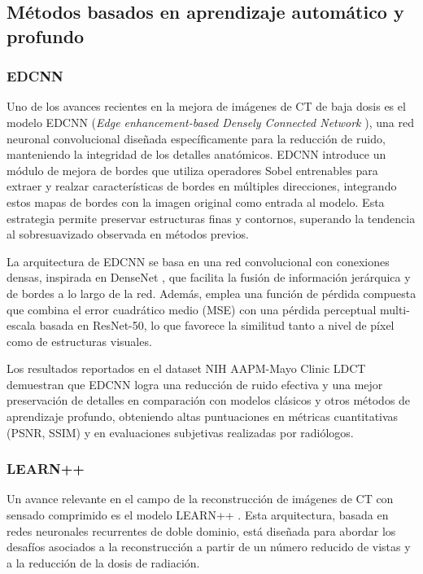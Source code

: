 \subsection{Métodos basados en aprendizaje automático y profundo}

\subsubsection{EDCNN}

Uno de los avances recientes en la mejora de imágenes de CT de baja dosis es el modelo EDCNN (\textit{Edge enhancement-based Densely Connected Network} \cite{EDCNN}), una red neuronal convolucional diseñada específicamente para la reducción de ruido, manteniendo la integridad de los detalles anatómicos. EDCNN introduce un módulo de mejora de bordes que utiliza operadores Sobel entrenables para extraer y realzar características de bordes en múltiples direcciones, integrando estos mapas de bordes con la imagen original como entrada al modelo. Esta estrategia permite preservar estructuras finas y contornos, superando la tendencia al sobresuavizado observada en métodos previos.

La arquitectura de EDCNN se basa en una red convolucional con conexiones densas, inspirada en DenseNet \cite{huang2017densely}, que facilita la fusión de información jerárquica y de bordes a lo largo de la red. Además, emplea una función de pérdida compuesta que combina el error cuadrático medio (MSE) con una pérdida perceptual multi-escala basada en ResNet-50, lo que favorece la similitud tanto a nivel de píxel como de estructuras visuales. 

Los resultados reportados en el dataset NIH AAPM-Mayo Clinic LDCT \cite{moen2021low} demuestran que EDCNN logra una reducción de ruido efectiva y una mejor preservación de detalles en comparación con modelos clásicos y otros métodos de aprendizaje profundo, obteniendo altas puntuaciones en métricas cuantitativas (PSNR, SSIM) y en evaluaciones subjetivas realizadas por radiólogos.

\subsubsection{LEARN++}

Un avance relevante en el campo de la reconstrucción de imágenes de CT con sensado comprimido es el modelo LEARN++ \cite{LEARN++}. Esta arquitectura, basada en redes neuronales recurrentes de doble dominio, está diseñada para abordar los desafíos asociados a la reconstrucción a partir de un número reducido de vistas y a la reducción de la dosis de radiación.


